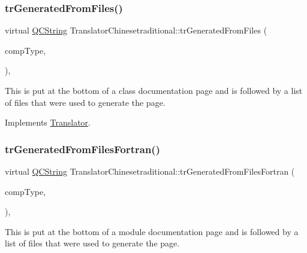 \subsubsection{\texorpdfstring{trGeneratedFromFiles()}{trGeneratedFromFiles()}}
{\footnotesize\ttfamily virtual \mbox{\hyperlink{class_q_c_string}{Q\+C\+String}} Translator\+Chinesetraditional\+::tr\+Generated\+From\+Files (\begin{DoxyParamCaption}\item[{\mbox{\hyperlink{class_class_def_ae70cf86d35fe954a94c566fbcfc87939}{Class\+Def\+::\+Compound\+Type}}}]{comp\+Type,  }\item[{bool}]{ }\end{DoxyParamCaption})\hspace{0.3cm}{\ttfamily [inline]}, {\ttfamily [virtual]}}

This is put at the bottom of a class documentation page and is followed by a list of files that were used to generate the page. 

Implements \mbox{\hyperlink{class_translator}{Translator}}.

\mbox{\label{class_translator_chinesetraditional_a97a68956eb70c4bd1187c14726069c29}} 
\subsubsection{\texorpdfstring{trGeneratedFromFilesFortran()}{trGeneratedFromFilesFortran()}}
{\footnotesize\ttfamily virtual \mbox{\hyperlink{class_q_c_string}{Q\+C\+String}} Translator\+Chinesetraditional\+::tr\+Generated\+From\+Files\+Fortran (\begin{DoxyParamCaption}\item[{\mbox{\hyperlink{class_class_def_ae70cf86d35fe954a94c566fbcfc87939}{Class\+Def\+::\+Compound\+Type}}}]{comp\+Type,  }\item[{bool}]{ }\end{DoxyParamCaption})\hspace{0.3cm}{\ttfamily [inline]}, {\ttfamily [virtual]}}

This is put at the bottom of a module documentation page and is followed by a list of files that were used to generate the page. 

